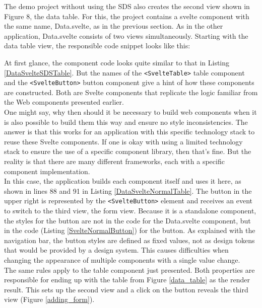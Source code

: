 The demo project without using the SDS also creates the second view shown in Figure 8, the data table. For this, the project contains a svelte component with the same name, Data.svelte, as in the previous section. As in the other application, Data.svelte consists of two views simultaneously. 
Starting with the data table view, the responsible code snippet looks like this:

At first glance, the component code looks quite similar to that in Listing \ref{DataSvelteSDSTable}. But the names of the \texttt{<SvelteTable>} table component and the \texttt{<SvelteButton>} button component give a hint of how these components are constructed. Both are Svelte components that replicate the logic familiar from the Web components presented earlier. \\
One might say, why then should it be necessary to build web components when it is also possible to build them this way and ensure no style inconsistencies. The answer is that this works for an application with this specific technology stack to reuse these Svelte components. If one is okay with using a limited technology stack to ensure the use of a specific component library, then that's fine. But the reality is that there are many different frameworks, each with a specific component implementation.\\
In this case, the application builds each component itself and uses it here, as shown in lines 88 and 91 in Listing \ref{DataSvelteNormalTable}. 
The button in the upper right is represented by the \texttt{<SvelteButton>} element and receives an event to switch to the third view, the form view. Because it is a standalone component, the styles for the button are not in the code for the Data.svelte component, but in the code (Listing \ref{SvelteNormalButton}) for the button. As explained with the navigation bar, the button styles are defined as fixed values, not as design tokens that would be provided by a design system. This causes difficulties when changing the appearance of multiple components with a single value change. \\
The same rules apply to the table component just presented. Both properties are responsible for ending up with the table from Figure \ref{data_table} as the render result. This sets up the second view and a click on the button reveals the third view (Figure \ref{adding_form}). \\


